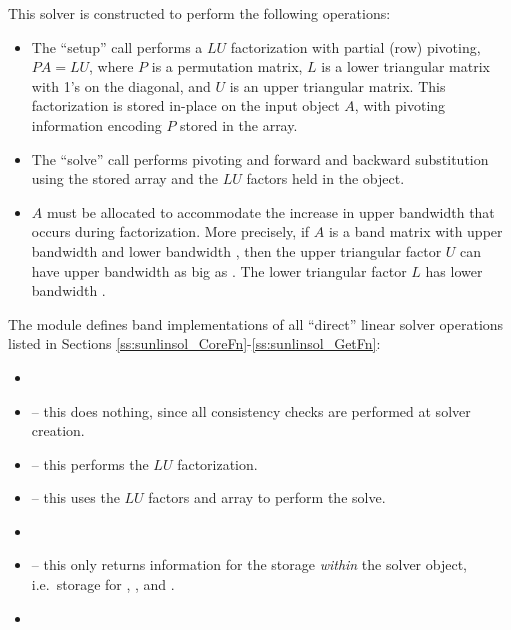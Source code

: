 This solver is constructed to perform the following operations:
\begin{itemize}
\item The ``setup'' call performs a $LU$ factorization with
  partial (row) pivoting, $PA=LU$, where $P$ is a permutation matrix,
  $L$ is a lower triangular matrix with 1's on the diagonal, and $U$
  is an upper triangular matrix.  This factorization is stored
  in-place on the input {\sunmatband} object $A$, with pivoting
  information encoding $P$ stored in the  array.
\item The ``solve'' call performs pivoting and forward and
  backward substitution using the stored  array and the
  $LU$ factors held in the {\sunmatband} object.
\item
  {\warn} $A$ must be allocated to accommodate the increase in upper
  bandwidth that occurs during factorization.  More precisely, if $A$
  is a band matrix with upper bandwidth  and lower bandwidth
  , then the upper triangular factor $U$ can have upper
  bandwidth as big as . The lower triangular
  factor $L$ has lower bandwidth .
\end{itemize}



\noindent The {\sunlinsolband} module defines band implementations of all
``direct'' linear solver operations listed in Sections
\ref{ss:sunlinsol_CoreFn}-\ref{ss:sunlinsol_GetFn}:
\begin{itemize}
\item {}
\item {} -- this does nothing, since all
  consistency checks are performed at solver creation.
\item {} -- this performs the $LU$ factorization.
\item {} -- this uses the $LU$ factors
  and  array to perform the solve.
\item {}
\item {} -- this only returns information for
  the storage \emph{within} the solver object, i.e.~storage
  for , , and .
\item {}
\end{itemize}
